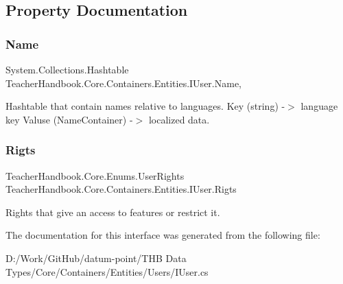 \subsection{Property Documentation}
\mbox{\label{interface_teacher_handbook_1_1_core_1_1_containers_1_1_entities_1_1_i_user_a528fbfbe0effa7e8683cb892b08c4c64}} 
\subsubsection{\texorpdfstring{Name}{Name}}
{\footnotesize\ttfamily System.\+Collections.\+Hashtable Teacher\+Handbook.\+Core.\+Containers.\+Entities.\+I\+User.\+Name\hspace{0.3cm}{\ttfamily [get]}, {\ttfamily [set]}}



Hashtable that contain names relative to languages. Key (string) -\/$>$ language key Valuse (Name\+Container) -\/$>$ localized data. 

\mbox{\label{interface_teacher_handbook_1_1_core_1_1_containers_1_1_entities_1_1_i_user_a147a0793a5587c93da634d0c997e13ec}} 
\subsubsection{\texorpdfstring{Rigts}{Rigts}}
{\footnotesize\ttfamily Teacher\+Handbook.\+Core.\+Enums.\+User\+Rights Teacher\+Handbook.\+Core.\+Containers.\+Entities.\+I\+User.\+Rigts\hspace{0.3cm}{\ttfamily [get]}}



Rights that give an access to features or restrict it. 



The documentation for this interface was generated from the following file\+:\begin{DoxyCompactItemize}
\item 
D\+:/\+Work/\+Git\+Hub/datum-\/point/\+T\+H\+B Data Types/\+Core/\+Containers/\+Entities/\+Users/I\+User.\+cs\end{DoxyCompactItemize}
